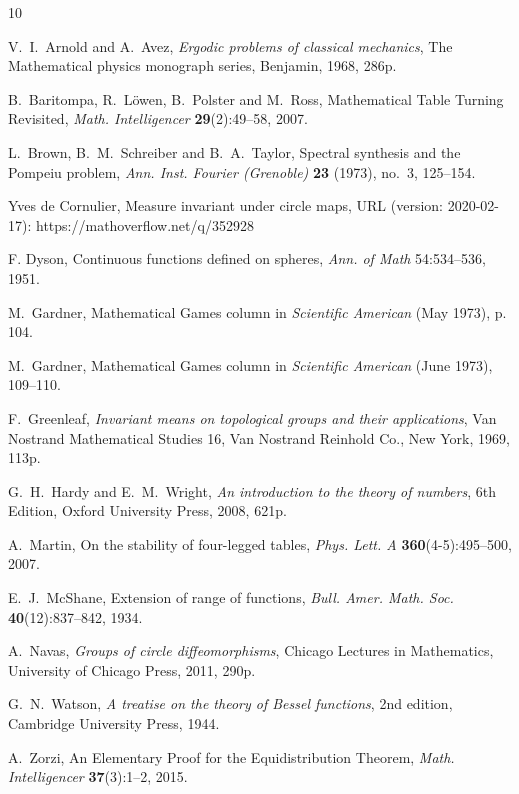 \documentclass[a4paper,11pt,twoside,leqno]{article}
\numberwithin{equation}{section}
\begin{document}
\begin{thebibliography}{10}

V.~I.~Arnold and A.~Avez, 
\newblock \emph{Ergodic problems of classical mechanics},
\newblock The Mathematical physics monograph series, Benjamin, 1968, 286p.

B.~Baritompa, R.~L\"owen, B.~Polster and M.~Ross,
\newblock Mathematical Table Turning Revisited,
\newblock \emph{Math. Intelligencer} \textbf{29}(2):49--58, 2007.

 L.~Brown, B.~M.~Schreiber and B.~A.~Taylor, Spectral synthesis and the Pompeiu problem, \emph{Ann. Inst. Fourier (Grenoble)} \textbf{23} (1973), no.~3, 125--154.

Yves de Cornulier, Measure invariant under circle maps, URL (version: 2020-02-17): https://mathoverflow.net/q/352928

F. Dyson, 
\newblock Continuous functions defined on spheres, 
\newblock \emph{Ann. of Math} 54:534--536, 1951.

M.~Gardner,
\newblock Mathematical Games column in \emph{Scientific American} (May 1973), p. 104.

M.~Gardner,
\newblock Mathematical Games column in \emph{Scientific American} (June 1973), 109--110.

F.~Greenleaf,
\newblock \emph{Invariant means on topological groups and their applications},
\newblock Van Nostrand Mathematical Studies 16, Van Nostrand Reinhold Co., New York, 1969, 113p.

G.~H.~Hardy and E.~M.~Wright,
\newblock \emph{An introduction to the theory of numbers}, 6th Edition, 
\newblock Oxford University Press, 2008, 621p.

A.~Martin, 
\newblock On the stability of four-legged tables,
\newblock \emph{Phys. Lett. A} \textbf{360}(4-5):495--500, 2007.

E.~J.~McShane,
\newblock Extension of range of functions,
\newblock \emph{Bull. Amer. Math. Soc.} \textbf{40}(12):837--842, 1934.

A.~Navas,
\newblock \emph{Groups of circle diffeomorphisms}, 
\newblock Chicago Lectures in Mathematics, University of Chicago Press, 2011, 290p.

 G.~N.~Watson, \emph{A treatise on the theory of Bessel functions}, 2nd edition, Cambridge University Press, 1944.

A.~Zorzi,
\newblock An Elementary Proof for the Equidistribution Theorem,
\newblock \emph{Math. Intelligencer} \textbf{37}(3):1--2, 2015. 


\end{thebibliography}
\end{document}
